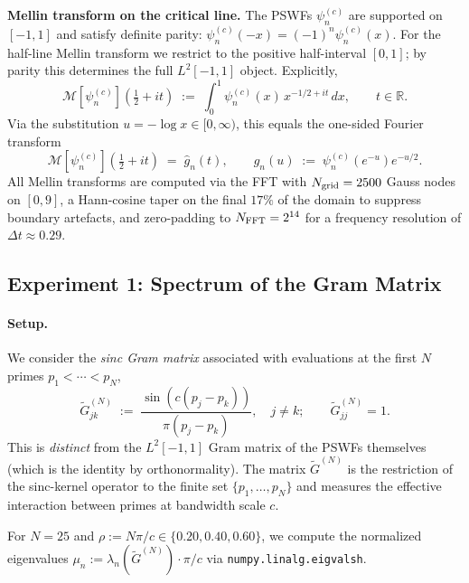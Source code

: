\documentclass[12pt,a4paper]{amsart}
\theoremstyle{definition}
\newcommand{\R}{\mathbb{R}}
\begin{document}
\medskip
\noindent\textbf{Mellin transform on the critical line.}
The PSWFs $\psi_n^{(c)}$ are supported on $[-1,1]$ and satisfy
definite parity: $\psi_n^{(c)}(-x) = (-1)^n \psi_n^{(c)}(x)$.
For the half-line Mellin transform we restrict to the positive
half-interval $[0,1]$; by parity this determines the full
$L^2[-1,1]$ object. Explicitly,
\begin{equation}
\label{eq:mellin-def}
\mathcal{M}[\psi_n^{(c)}]\!\left(\tfrac{1}{2}+it\right)
\;:=\;
\int_0^1 \psi_n^{(c)}(x)\,x^{-1/2+it}\,dx,
\qquad t \in \R.
\end{equation}
Via the substitution $u = -\log x \in [0,\infty)$, this equals
the one-sided Fourier transform
\begin{equation}
\label{eq:mellin-fourier}
\mathcal{M}[\psi_n^{(c)}]\!\left(\tfrac{1}{2}+it\right)
\;=\; \widehat{g}_n(t),
\qquad
g_n(u) \;:=\; \psi_n^{(c)}\!\left(e^{-u}\right) e^{-u/2}.
\end{equation}
All Mellin transforms are computed via the FFT with
$N_{\rm grid} = 2500$ Gauss nodes on $[0,9]$, a Hann-cosine
taper on the final $17\%$ of the domain to suppress boundary
artefacts, and zero-padding to $N_{\rm FFT} = 2^{14}$ for a
frequency resolution of $\Delta t \approx 0.29$.

\subsection{Experiment 1: Spectrum of the Gram Matrix}
\label{ssec:exp1}

\paragraph{Setup.}
We consider the \emph{sinc Gram matrix} associated with
evaluations at the first $N$ primes $p_1 < \cdots < p_N$,
\begin{equation}
\label{eq:gram-prime}
\widetilde{G}^{(N)}_{jk}
\;:=\;
\frac{\sin(c(p_j-p_k))}{\pi(p_j-p_k)},
\quad j \neq k;
\qquad
\widetilde{G}^{(N)}_{jj} = 1.
\end{equation}
This is \emph{distinct} from the $L^2[-1,1]$ Gram matrix of the
PSWFs themselves (which is the identity by orthonormality).
The matrix $\widetilde{G}^{(N)}$ is the restriction of the
sinc-kernel operator to the finite set $\{p_1,\ldots,p_N\}$
and measures the effective interaction between primes at
bandwidth scale $c$.

For $N = 25$ and $\rho := N\pi/c \in \{0.20, 0.40, 0.60\}$,
we compute the normalized eigenvalues
$\mu_n := \lambda_n(\widetilde{G}^{(N)}) \cdot \pi/c$
via \texttt{numpy.linalg.eigvalsh}.
\end{document}
